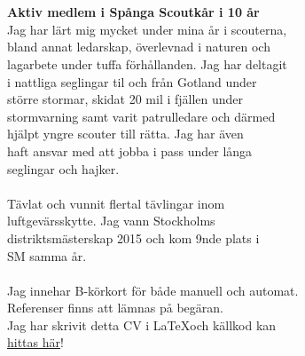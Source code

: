 \documentclass[11pt,oneside,a4paper,titlepage]{article}
\begin{document}
\begin{tcolorbox}
    \begin{minipage}[t]{2cm}
        \begin{tcolorbox}[colframe=white,colback=white]
            
        \end{tcolorbox}
    \end{minipage}
    \begin{minipage}[t]{15cm}
        \begin{tcolorbox}[colframe=white,colback=white]
            {\selectfont
                \\
                \\\textbf{Aktiv medlem i Spånga Scoutkår i 10 år}\\
                Jag har lärt mig mycket under mina år i scouterna,\\
                bland annat ledarskap, överlevnad i naturen och\\
                lagarbete under tuffa förhållanden. Jag har deltagit\\
                i nattliga seglingar til och från Gotland under\\
                större stormar, skidat 20 mil i fjällen under\\
                stormvarning samt varit patrulledare och därmed\\
                hjälpt yngre scouter till rätta. Jag har även\\
                haft ansvar med att jobba i pass under långa\\
                seglingar och hajker.\\\\
                Tävlat och vunnit flertal tävlingar inom\\
                luftgevärsskytte. Jag vann Stockholms\\
                distriktsmästerskap 2015 och kom 9nde plats i\\
                SM samma år.\\\\
                Jag innehar B-körkort för både manuell och automat.\\

                Referenser finns att lämnas på begäran.\\

                Jag har skrivit detta CV i \LaTeX och källkod kan\\
                \href{https://github.com/v-olin/resume}{hittas här}!
            }
        \end{tcolorbox}
    \end{minipage}
\end{tcolorbox}
\end{document}
